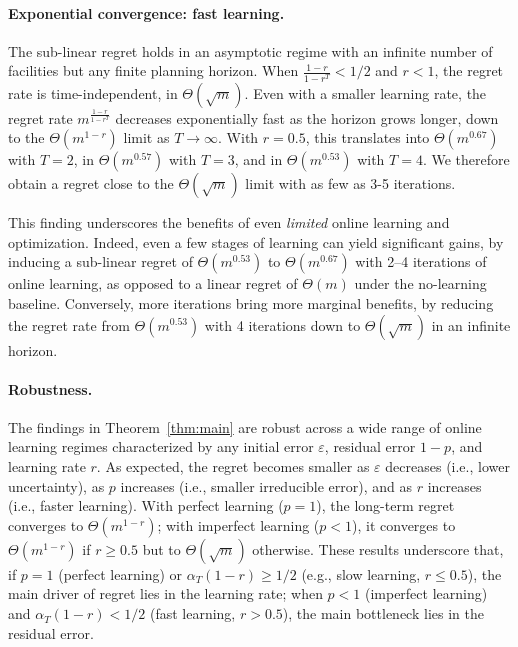 \documentclass[blindrev]{informs3noheader}
\begin{document}
\paragraph{Exponential convergence: fast learning.}

The sub-linear regret holds in an asymptotic regime with an infinite number of facilities but any finite planning horizon. When $\frac{1-r}{1-r^{T}}<1/2$ and $r<1$, the regret rate is time-independent, in $\Theta(\sqrt{m})$. Even with a smaller learning rate, the regret rate $m^{\frac{1-r}{1-r^{T}}}$ decreases exponentially fast as the horizon grows longer, down to the $\Theta(m^{1-r})$ limit as $T\to\infty$. With $r=0.5$, this translates into $\Theta(m^{0.67})$ with $T=2$, in $\Theta(m^{0.57})$ with $T=3$, and in $\Theta(m^{0.53})$ with $T=4$. We therefore obtain a regret close to the $\Theta(\sqrt{m})$ limit with as few as 3-5 iterations.

This finding underscores the benefits of even \textit{limited} online learning and optimization. Indeed, even a few stages of learning can yield significant gains, by inducing a sub-linear regret of $\Theta(m^{0.53})$ to $\Theta(m^{0.67})$ with 2--4 iterations of online learning, as opposed to a linear regret of $\Theta(m)$ under the no-learning baseline. Conversely, more iterations bring more marginal benefits, by reducing the regret rate from $\Theta(m^{0.53})$ with 4 iterations down to $\Theta(\sqrt{m})$ in an infinite horizon.

\paragraph{Robustness.}

The findings in Theorem~\ref{thm:main} are robust across a wide range of online learning regimes characterized by any initial error $\varepsilon$, residual error $1-p$, and learning rate  $r$. As expected, the regret becomes smaller as $\varepsilon$ decreases (i.e., lower uncertainty), as $p$ increases (i.e., smaller irreducible error), and as $r$ increases (i.e., faster learning). With perfect learning ($p=1$), the long-term regret converges to $\Theta\left(m^{1-r}\right)$; with imperfect learning ($p<1$), it converges to $\Theta\left(m^{1-r}\right)$ if $r\geq0.5$ but to $\Theta(\sqrt m)$ otherwise. These results underscore that, if $p=1$ (perfect learning) or $\alpha_T(1-r)\geq1/2$ (e.g., slow learning, $r\leq0.5$), the main driver of regret lies in the learning rate; when $p<1$ (imperfect learning) and $\alpha_T(1-r)<1/2$ (fast learning, $r>0.5$), the main bottleneck lies in the residual error.
\end{document}
